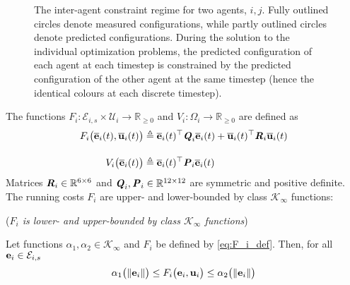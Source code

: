 \begin{figure}[ht!]
  \centering
  
  \caption{The inter-agent constraint regime for two agents, $i,j$. Fully
    outlined circles denote measured configurations, while partly outlined
    circles denote predicted configurations. During the solution to the
    individual optimization problems, the predicted configuration of each agent
    at each timestep is constrained by the predicted configuration of the other
    agent at the same timestep (hence the identical colours at each discrete
    timestep).}
  \label{fig:constraint_regime_horizon}
\end{figure}


The functions
$F_i : \mathcal{E}_{i,s} \times \mathcal{U}_i \to \mathbb{R}_{\geq 0}$ and
$V_i: \Omega_i \to \mathbb{R}_{\geq 0}$ are defined as
\begin{align}
  F_i \big(\overline{\bm{\mathbf{e}}}_i(t), \overline{\bm{\mathbf{u}}}_i(t)\big)
    &\triangleq \overline{\bm{\mathbf{e}}}_i(t)^{\top} \bm{\mathit{Q}}_i \overline{\bm{\mathbf{e}}}_i(t)
  + \overline{\bm{\mathbf{u}}}_i(t)^{\top} \bm{\mathit{R}}_i \overline{\bm{\mathbf{u}}}_i(t) \label{eq:F_i_def} \\[2.5ex]
  V_i \big(\overline{\bm{\mathbf{e}}}_i(t)\big) & \triangleq \overline{\bm{\mathbf{e}}}_i(t)^{\top} \bm{\mathit{P}}_i \overline{\bm{\mathbf{e}}}_i(t) \label{eq:V_i_def}
\end{align}
Matrices $\bm{\mathit{R}}_i \in \mathbb{R}^{6 \times 6}$ and
$\bm{\mathit{Q}}_i, \bm{\mathit{P}}_i \in \mathbb{R}^{12 \times 12}$ are symmetric and positive
definite.  The running costs $F_i$ are upper- and lower-bounded by class
$\mathcal{K}_{\infty}$ functions:

\begin{bw_box}
  \begin{lemma} (\textit{$F_i$ is lower- and upper-bounded by class $\mathcal{K}_{\infty}$ functions})
    \label{lemma:F_i_bounded_K_class}

    Let functions $\alpha_1, \alpha_2 \in \mathcal{K}_{\infty}$ and $F_i$
    be defined by \eqref{eq:F_i_def}. Then, for all
    $\bm{\mathbf{e}}_i \in \mathcal{E}_{i,s}$
    \begin{align}
      \alpha_1\big(\|\bm{\mathbf{e}}_i\|\big) \leq F_i\big(\bm{\mathbf{e}}_i, \bm{\mathbf{u}}_i\big) \leq \alpha_2\big(\| \bm{\mathbf{e}}_i \|\big)
    \end{align}
  \end{lemma}
\end{bw_box}


